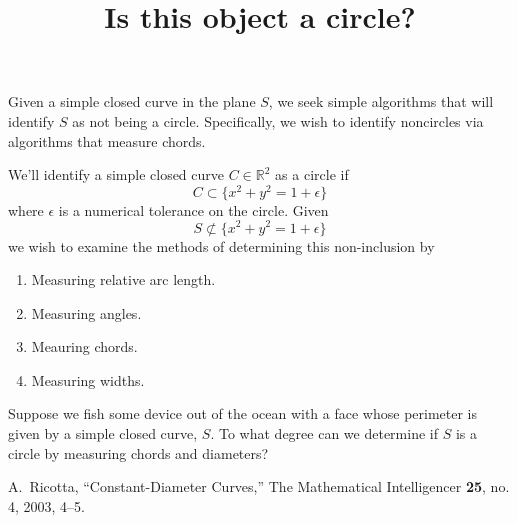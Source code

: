 \documentclass[11pt]{amsart}
\title{Is this object a circle?}
\author{}
\date{}
\newcommand{\R}{\mathbb{R}}
\theoremstyle{plain}
\theoremstyle{definition}
\theoremstyle{remark}
\begin{document}
\maketitle



Given a simple closed curve in the plane $S$, we seek simple
algorithms that will identify $S$ as not being a circle. Specifically,
we wish to identify noncircles via algorithms that measure chords.

We'll identify a simple closed curve $C\in\R^2$ as a circle if
\[
C\subset \{x^2+y^2 = 1 + \epsilon \}
\]
where $\epsilon$ is a numerical tolerance on the circle. Given
\[
S\not\subset \{x^2+y^2 = 1 + \epsilon \}
\]
we wish to examine the methods of determining this non-inclusion by
\begin{enumerate}
\item Measuring relative arc length.
\item Measuring angles.
\item Meauring chords.
\item Measuring widths.
\end{enumerate}

Suppose we fish some device out of the ocean with a face whose
perimeter is given by a simple closed curve, \(S\).  To what degree
can we determine if \(S\) is a circle by measuring chords and
diameters?


\begin{thebibliography}{9}
 A.\ Ricotta, ``Constant-Diameter Curves,'' The Mathematical
Intelligencer \textbf{25}, no. 4, 2003, 4--5.
\end{thebibliography}
\end{document}
